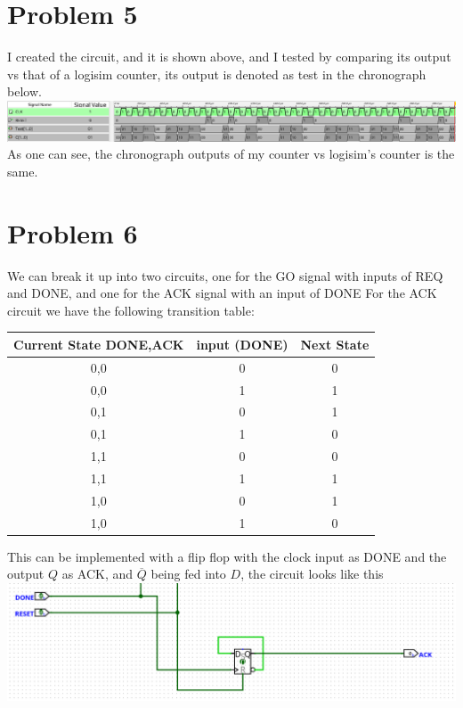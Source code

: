 \documentclass[12pt]{article}
\begin{document}
\section*{Problem 5}
I created the circuit, and it is shown above, and I tested 
by comparing its output vs that of a logisim counter, its output is denoted
as test in the chronograph below.\\
\includegraphics[scale=0.2]{fig8.png}
As one can see, the chronograph outputs of my counter vs logisim's counter is the same.
\section*{Problem 6}
We can break it up into two circuits, one for the GO signal with inputs of REQ and DONE, and one for the ACK signal with an input of DONE
For the ACK circuit we have the following transition table:
\begin{center}
    
    \begin{tabular}{|c|c|c|}
        Current State DONE,ACK & input (DONE) & Next State \\
        \hline
        0,0 & 0 & 0\\
        \hline
        0,0 & 1 & 1\\
        \hline
        0,1 & 0 & 1\\
        \hline
        0,1 & 1 & 0\\
        \hline
        1,1 & 0 & 0\\
        \hline
        1,1 & 1 & 1\\
        \hline
        1,0 & 0 & 1\\
        \hline
        1,0 & 1 & 0\\
        \hline
    \end{tabular}
\end{center}
This can be implemented with a flip flop with the clock input as DONE and the
output $Q$ as ACK, and $\overline{Q}$ being fed into $D$, the circuit looks like this\\
\includegraphics[scale=0.25]{fig13.png}\\
\end{document}
